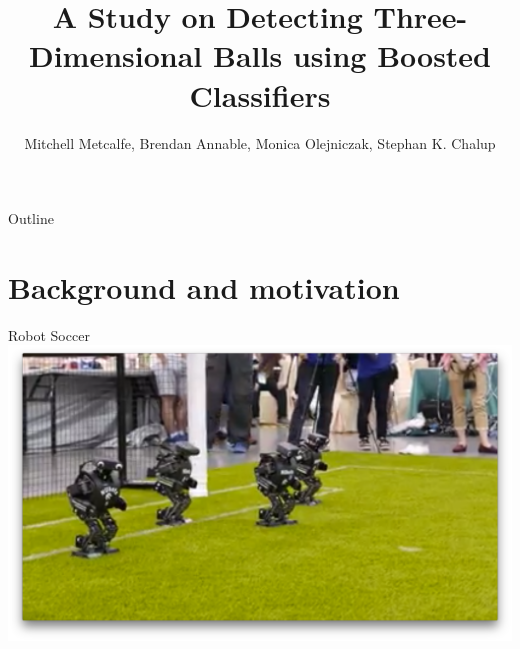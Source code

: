 



\title{A Study on Detecting Three-Dimensional Balls using Boosted Classifiers}
\author{Mitchell Metcalfe, Brendan Annable, Monica Olejniczak, Stephan K. Chalup}




\maketitle

\begin{frame}{Outline}
    \tableofcontents
\end{frame}

\section{Background and motivation}
\begin{frame}{Robot Soccer}
	\includegraphics[height=0.6\textwidth]{nubots-first-frame.png}
\end{frame}

